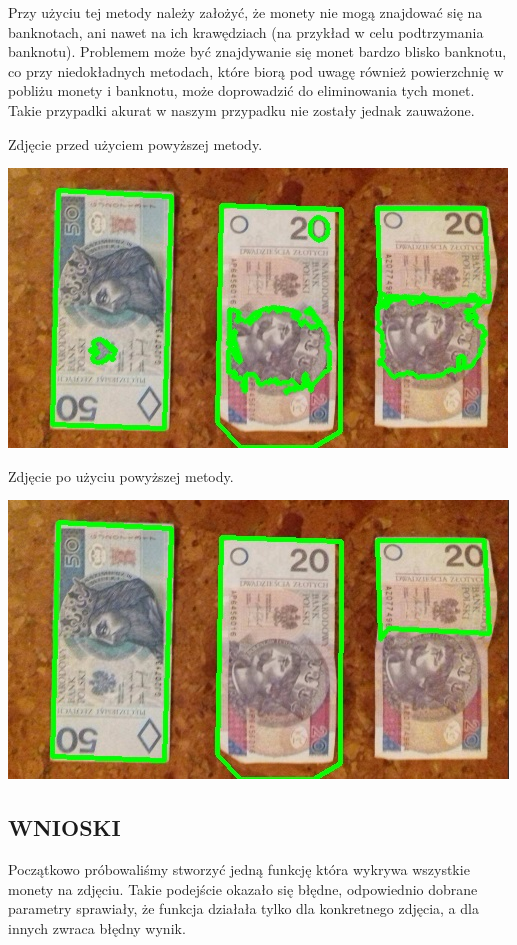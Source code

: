 \documentclass[12pt]{article}
\begin{document}
Przy użyciu tej metody należy założyć, że monety nie mogą znajdować się na banknotach, ani nawet na ich krawędziach (na przykład w celu podtrzymania banknotu). Problemem może być znajdywanie się monet bardzo blisko banknotu, co przy niedokładnych metodach, które biorą pod uwagę również powierzchnię w pobliżu monety i banknotu, może doprowadzić do eliminowania tych monet. Takie przypadki akurat w naszym przypadku nie zostały jednak zauważone.

Zdjęcie przed użyciem powyższej metody.

\includegraphics[scale=0.8]{banknoty1}

Zdjęcie po użyciu powyższej metody.

\includegraphics[scale=0.8]{banknoty2}

\newpage
\subsection*{WNIOSKI}
Początkowo próbowaliśmy stworzyć jedną funkcję która wykrywa wszystkie monety na zdjęciu. Takie podejście okazało się błędne, odpowiednio dobrane parametry sprawiały, że funkcja działała tylko dla konkretnego zdjęcia, a dla innych zwraca błędny wynik. 
\end{document}
